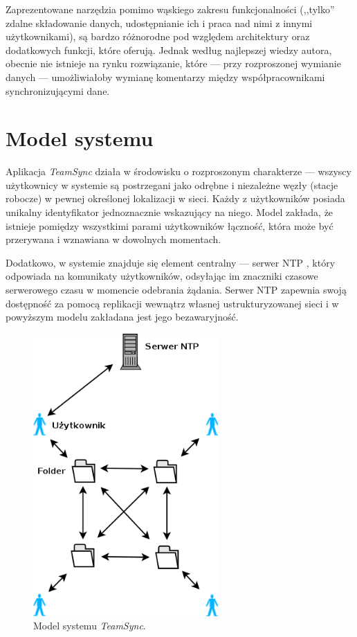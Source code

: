 \documentclass[polish,a4paper,twoside]{ppfcmthesis}
\begin{document}
Zaprezentowane narzędzia pomimo wąskiego zakresu funkcjonalności (,,tylko'' zdalne składowanie danych, udostępnianie ich i praca nad nimi z innymi użytkownikami), są bardzo różnorodne pod względem architektury oraz dodatkowych funkcji, które oferują. Jednak według najlepszej wiedzy autora, obecnie nie istnieje na rynku rozwiązanie, które --- przy rozproszonej wymianie danych --- umożliwiałoby wymianę komentarzy między współpracownikami synchronizującymi dane.

\chapter{Model systemu}

Aplikacja \emph{TeamSync} działa w środowisku o rozproszonym charakterze --- wszyscy użytkownicy w systemie są postrzegani jako odrębne i niezależne węzły (stacje robocze) w pewnej określonej lokalizacji w sieci. Każdy z użytkowników posiada unikalny identyfikator jednoznacznie wskazujący na niego. Model zakłada, że istnieje pomiędzy wszystkimi parami użytkowników łączność, która może być przerywana i wznawiana w dowolnych momentach.

Dodatkowo, w systemie znajduje się element centralny --- serwer NTP \cite{ntp} \cite{ntparticle}, który odpowiada na komunikaty użytkowników, odsyłając im znaczniki czasowe serwerowego czasu w momencie odebrania żądania. Serwer NTP zapewnia swoją dostępność za pomocą replikacji wewnątrz własnej ustrukturyzowanej sieci i w powyższym modelu zakładana jest jego bezawaryjność.

\begin{figure}[htb]
  \vspace{5pt}
  \begin{center}
    \includegraphics[width=200pt]{figures/model.png}
  \end{center}
  \caption{Model systemu \emph{TeamSync}.}
\end{figure}
\end{document}
